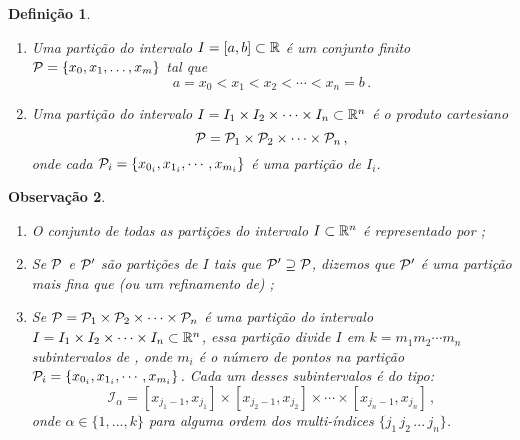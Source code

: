 \documentclass[a4paper,12pt]{extreport}
\newtheorem{mydef}{Definição}
\newtheorem{myobs}[mydef]{Observação}
\begin{document}
\begin{mydef}
  \begin{enumerate}[label=\alph*)]
  \item Uma partição do intervalo $I = [a,b] \subset \mathbb{R}$
    é um conjunto finito\linebreak
    $\mathcal{P} = \{x_0, x_1, \dots, x_m \}$ tal que
    \begin{equation}
      a = x_0 < x_1 < x_2 < \cdots < x_n = b\,.
    \end{equation}
  \item Uma partição do intervalo
    $I = I_1 \times I_2 \times \cdots \times I_n \subset \mathbb{R}^n$
    é o produto cartesiano
    \begin{equation}
      \mathcal{P} =
      \mathcal{P}_1 \times \mathcal{P}_2
      \times \cdots \times \mathcal{P}_n\,,
    \end{equation}
    onde cada $\mathcal{P}_i = \{x_{0_i}, x_{1_i}, \cdots, x_{m_i} \}$
    é uma partição de $I_i$.
  \end{enumerate}
\end{mydef}

\begin{myobs}\label{obs:partition}
  \begin{enumerate}[label=\alph*)]
  \item O conjunto de todas as partições do intervalo $I \subset \mathbb{R}^n$
    é representado por ;

  \item Se $\mathcal{P}$ e $\mathcal{P}'$ são partições de $I$ tais que
    $\mathcal{P}' \supseteq \mathcal{P}$,
    dizemos que $\mathcal{P}'$ é uma partição \emph{mais fina} que
    (ou um \emph{refinamento} de) \partition{};

  \item Se $\mathcal{P}{} =
    \mathcal{P}_1 \times \mathcal{P}_2 \times \cdots \times \mathcal{P}_n$
    é uma partição do intervalo
    $I = I_1 \times I_2 \times \cdots \times I_n \subset \mathbb{R}^n$,
    essa partição divide $I$ em $k = m_1m_2 \cdots m_n$
    subintervalos de \rn{},
    onde $m_i$ é o número de pontos na partição
    $\mathcal{P}_i = \{x_{0_i}, x_{1_i}, \cdots, x_{m_i} \}$.
    Cada um desses subintervalos é do tipo:
    \begin{equation}
      \mathcal{I}_\alpha =
      [x_{j_1-1}, x_{j_1}] \times
      [x_{j_2-1}, x_{j_2}] \times
      \cdots \times
      [x_{j_n-1}, x_{j_n}]\,,
    \end{equation}
    onde $\alpha \in \{1, ..., k\}$
    para alguma ordem dos multi-índices
    $\{j_1 \, j_2 \, ... \, j_n\}$.
  \end{enumerate}
\end{myobs}
\end{document}
